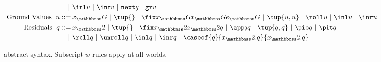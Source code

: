 \begin{figure}[t]
\begin{abstrsyn}
\[\begin{aligned}
\gbar& \inl v 
 \gbar \inr v 
 \gbar \next y
 \gbar \pure v \\
\text{Ground Values}\ \ 
u ::=\,& \varG
 \gbar\tup{}
 \gbar \fix \varG \varG \exprG
 \gbar \tup{u, u} 
 \gbar \roll u
 \gbar \inl u 
 \gbar \inr u \\
\text{Residuals}\ \ 
q ::=\,& \varT
 \gbar \tup{}
 \gbar \fix \varT \varT q
 \gbar \app q q 
 \gbar \tup{q, q} 
 \gbar \pio q 
 \gbar \pit q \\
\gbar& \roll q
 \gbar \unroll q
 \gbar \inl q 
 \gbar \inr q
 \gbar \caseof {q}{\varT.q}{\varT.q} \\
\end{aligned}\]
\end{abstrsyn}
\caption{\lang\ abstract syntax. Subscript-$w$ rules apply at all worlds.}
\label{fig:grammar}
\end{figure}
